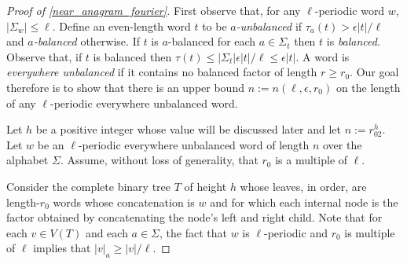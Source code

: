 \documentclass{patmorin}
\begin{document}
\begin{proof}[Proof of \cref{near_anagram_fourier}]
    First observe that, for any $\ell$-periodic word $w$, $|\Sigma_w|\le\ell$.
    Define an even-length word $t$ to be \emph{$a$-unbalanced} if $\tau_a(t)>\epsilon|t|/\ell$ and \emph{$a$-balanced} otherwise.  If $t$ is $a$-balanced for each $a\in\Sigma_t$ then $t$ is \emph{balanced}. Observe that, if $t$ is balanced then $\tau(t)\le |\Sigma_t|\epsilon|t|/\ell\le \epsilon|t|$. A word is \emph{everywhere unbalanced} if it contains no balanced factor of length $r\ge r_0$. Our goal therefore is to show that there is an upper bound $n:=n(\ell,\epsilon,r_0)$ on the length of any $\ell$-periodic everywhere unbalanced word.

    Let $h$ be a positive integer whose value will be discussed later and let $n:=r_02^{h}$. Let $w$ be an $\ell$-periodic everywhere unbalanced word of length $n$ over the alphabet $\Sigma$.  Assume, without loss of generality, that $r_0$ is a multiple of $\ell$.

    Consider the complete binary tree $T$ of height $h$ whose leaves, in order, are length-$r_0$ words whose concatenation is $w$ and for which each internal node is the factor obtained by concatenating the node's left and right child.
    Note that for each $v\in V(T)$ and each $a\in\Sigma$, the fact that $w$ is $\ell$-periodic and $r_0$ is multiple of $\ell$ implies that $|v|_{a}\ge |v|/\ell$.





\end{proof}
\end{document}
